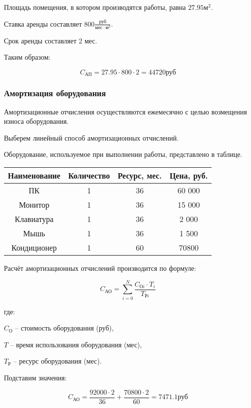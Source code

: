 Площадь помещения, в котором производятся работы, равна $27.95 \text{м}^2$.

Ставка аренды составляет $800 \frac{\text{руб}}{\text{мес}\cdot\text{м}^2}$.

Срок аренды составляет 2 мес.

Таким образом:

$$ C_\text{АП} = 27.95 \cdot 800 \cdot 2 = 44720\text{руб} $$

\subsubsection{Амортизация оборудования}

Амортизационные отчисления осуществляются ежемесячно с целью
возмещения износа оборудования.

Выберем линейный способ амортизационных отчислений.

Оборудование, используемое при выполнении работы, представлено в таблице.

\vspace{1em}

\begin{tabular}{|c|c|c|c|}
\hline
Наименование & Количество & Ресурс, мес. & Цена, руб. \\
\hline
ПК & 1 & 36 & 60 000 \\
\hline
Монитор & 1 & 36 & 15 000 \\
\hline
Клавиатура & 1 & 36 & 2 000 \\
\hline
Мышь & 1 & 36 & 1 500 \\
\hline
Кондиционер & 1 & 60 & 70800 \\
\hline
\end{tabular}

\vspace{1em}

Расчёт амортизационных отчислений производится по формуле:

$$ C_\text{АО} = \sum_{i=0}^{N} \frac{C_{\text{О}i} \cdot T_i}{T_{\text{Р}i}} $$

где:

$C_\text{О}$ -- стоимость оборудования (руб),

$T$ -- время использования оборудования (мес),

$T_\text{Р}$ -- ресурс оборудования (мес).

Подставим значения:

$$ C_\text{АО} = \frac{92000 \cdot 2}{36} +
\frac{70800 \cdot 2}{60} = 7471.1 \text{руб} $$

